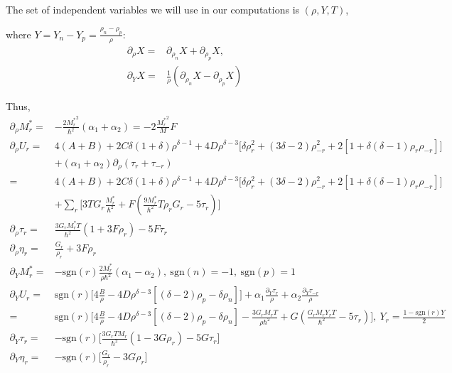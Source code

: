 \documentclass[preprint,prc,preprintnumbers,superscriptaddress,amsmath,amssymb,floatfix]{revtex4-1}
\begin{document}
The set of independent variables we will use in our computations is $(\rho,Y,T)$,

where $Y= Y_n-Y_p =\frac{\rho_n-\rho_p}{\rho}$:
\begin{equation}
 \begin{split}
  \partial_{\rho}X =& \partial_{\rho_n}X + \partial_{\rho_p}X, \\
  \partial_{Y}X=& \frac{1}{\rho} (\partial_{\rho_n}X - \partial_{\rho_p}X)
 \end{split}
\end{equation}

Thus,
\begin{equation}
 \begin{split}
  \partial_{\rho}M^{*}_r=&-\frac{2{M_r^{*}}^2}{\hbar^2}(\alpha_1+\alpha_2)=-2\frac{{M^{*}_r}^2}{M}F\\
  \partial_{\rho}U_r=&4 (A+B)+2 C \delta(1+\delta)\rho^{\delta-1}+4D\rho^{\delta-3}\big[\delta \rho_r^2+(3\delta-2)\rho_{-r}^2+2[1+\delta(\delta-1)\rho_r\rho_{-r}]\big]\\
  &+(\alpha_1+\alpha_2)\partial_{\rho}(\tau_r+\tau_{-r})\\
  =&4 (A+B)+2 C \delta(1+\delta)\rho^{\delta-1}+4D\rho^{\delta-3}\big[\delta \rho_r^2+(3\delta-2)\rho_{-r}^2+2[1+\delta(\delta-1)\rho_r\rho_{-r}]\big]\\
  &+\sum_r\big[3TG_r\frac{M_r^{*}}{\hbar^2}+F(\frac{9M_r^{*}}{\hbar^2}T\rho_rG_r-5\tau_r)\big]\\
  \partial_{\rho}\tau_r=&\frac{3G_rM_r^{*}T}{\hbar^2}(1+3F\rho_r)-5F \tau_r\\
  \partial_{\rho}\eta_r=&\frac{G_r}{\rho_r}+3F\rho_r\\
  \partial_{Y}M^{*}_r=&-\text{sgn}(r)\frac{2M_r^{*}}{\rho \hbar^2}(\alpha_1-\alpha_2),\ \text{sgn}(n)=-1,\ \text{sgn}(p)=1\\
  \partial_Y U_r=& \text{sgn}(r)\big[4 \frac{B}{\rho}-4D \rho^{\delta-3}[(\delta-2)\rho_p-\delta \rho_n]\big]+\alpha_1\frac{\partial_Y\tau_r}{\rho}+\alpha_2\frac{\partial_Y\tau_{-r}}{\rho}\\
  =&\text{sgn}(r)\big[4 \frac{B}{\rho}-4D \rho^{\delta-3}[(\delta-2)\rho_p-\delta \rho_n]-\frac{3 G_r M_r T}{\rho \hbar^2}+G(\frac{G_r M_r Y_r T}{ \hbar^2}-5\tau_r)\big],\ Y_r = \frac{1-\text{sgn}(r)Y}{2}\\
 \partial_{Y}\tau_r=&-\text{sgn}(r)\big[\frac{3G_rTM_r}{\hbar^2}(1-3G\rho_r)-5G\tau_r\big]\\
 \partial_Y\eta_r=&-\text{sgn}(r)\big[\frac{G_r}{\rho_r}-3G\rho_r\big]\\
 \end{split}
\end{equation}
\end{document}
